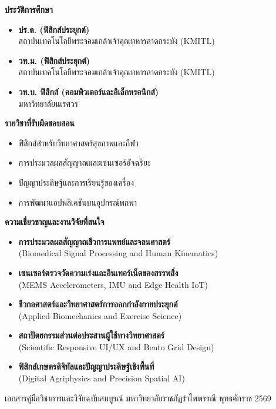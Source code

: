 \noindent
\begin{minipage}[t]{0.48\textwidth}
  {\fontsize{13pt}{16pt}\selectfont\bfseries\color{rbruNavy} ประวัติการศึกษา}\\[2mm]
  \begin{itemize}[leftmargin=1.5em, itemsep=2pt, topsep=1pt]
    \item \textbf{ปร.ด. (ฟิสิกส์ประยุกต์)}\\
          สถาบันเทคโนโลยีพระจอมเกล้าเจ้าคุณทหารลาดกระบัง (KMITL)
    \item \textbf{วท.ม. (ฟิสิกส์ประยุกต์)}\\
          สถาบันเทคโนโลยีพระจอมเกล้าเจ้าคุณทหารลาดกระบัง (KMITL)
    \item \textbf{วท.บ. ฟิสิกส์ (คอมพิวเตอร์และอิเล็กทรอนิกส์)}\\
          มหาวิทยาลัยนเรศวร
  \end{itemize}

  \vspace{4mm}
  {\fontsize{13pt}{16pt}\selectfont\bfseries\color{rbruNavy} รายวิชาที่รับผิดชอบสอน}\\[2mm]
  \begin{itemize}[leftmargin=1.5em, itemsep=2pt, topsep=1pt]
    \item ฟิสิกส์สำหรับวิทยาศาสตร์สุขภาพและกีฬา
    \item การประมวลผลสัญญาณและเซนเซอร์อัจฉริยะ
    \item ปัญญาประดิษฐ์และการเรียนรู้ของเครื่อง
    \item การพัฒนาแอปพลิเคชันบนอุปกรณ์พกพา
  \end{itemize}
\end{minipage}
\hfill
\begin{minipage}[t]{0.48\textwidth}
  {\fontsize{13pt}{16pt}\selectfont\bfseries\color{rbruNavy} ความเชี่ยวชาญและงานวิจัยที่สนใจ}\\[2mm]
  \begin{itemize}[leftmargin=1.5em, itemsep=2pt, topsep=1pt]
    \item \textbf{การประมวลผลสัญญาณชีวการแพทย์และจลนศาสตร์}\\
          (Biomedical Signal Processing and Human Kinematics)
    \item \textbf{เซนเซอร์ตรวจวัดความเร่งและอินเทอร์เน็ตของสรรพสิ่ง}\\
          (MEMS Accelerometers, IMU and Edge Health IoT)
    \item \textbf{ชีวกลศาสตร์และวิทยาศาสตร์การออกกำลังกายประยุกต์}\\
          (Applied Biomechanics and Exercise Science)
    \item \textbf{สถาปัตยกรรมส่วนต่อประสานผู้ใช้ทางวิทยาศาสตร์}\\
          (Scientific Responsive UI/UX and Bento Grid Design)
    \item \textbf{ฟิสิกส์เกษตรดิจิทัลและปัญญาประดิษฐ์เชิงพื้นที่}\\
          (Digital Agriphysics and Precision Spatial AI)
  \end{itemize}
\end{minipage}

\vfill
\begin{center}
  {\fontsize{9pt}{12pt}\selectfont\color{gray} เอกสารคู่มือวิชาการและวิจัยฉบับสมบูรณ์ มหาวิทยาลัยราชภัฏรำไพพรรณี พุทธศักราช 2569}
\end{center}
